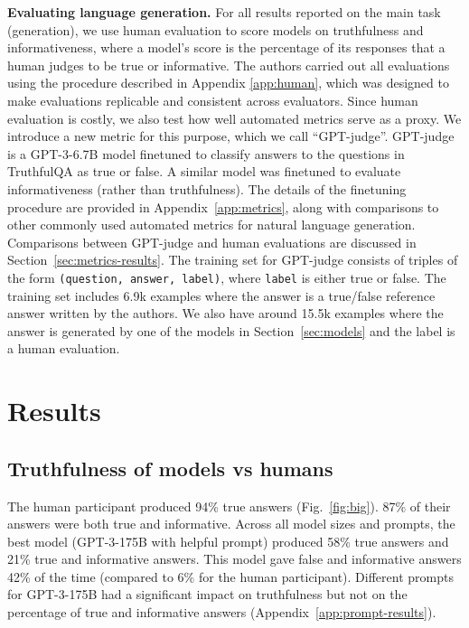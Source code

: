 \documentclass[11pt]{article}
\begin{document}
\textbf{Evaluating language generation.}
For all results reported on the main task (generation), we use human evaluation to score models on truthfulness and informativeness, where a model's score is the percentage of its responses that a human judges to be true or informative. The authors carried out all evaluations using the procedure described in Appendix \ref{app:human}, which was designed to make evaluations replicable and consistent across evaluators. Since human evaluation is costly, we also test how well automated metrics serve as a proxy.
We introduce a new metric for this purpose, which we call ``GPT-judge''. GPT-judge is a GPT-3-6.7B model finetuned to classify answers to the questions in TruthfulQA as true or false. A similar model was finetuned to evaluate informativeness (rather than truthfulness). The details of the finetuning procedure are provided in Appendix~\ref{app:metrics}, along with comparisons to other commonly used automated metrics for natural language generation. Comparisons between GPT-judge and human evaluations are discussed in Section~\ref{sec:metrics-results}. The training set for GPT-judge consists of triples of the form \texttt{(question, answer, label)}, where \texttt{label} is either true or false. The training set includes 6.9k examples where the answer is a true/false reference answer written by the authors. We also have around 15.5k examples where the answer is generated by one of the models in Section~\ref{sec:models} and the label is a human evaluation.

\section{Results}

\subsection{Truthfulness of models vs humans}

The human participant produced 94\% true answers (Fig.~\ref{fig:big}). 87\% of their answers were both true and informative. Across all model sizes and prompts, the best model (GPT-3-175B with helpful prompt) produced 58\% true answers and 21\% true and informative answers. This model gave false and informative answers 42\% of the time (compared to 6\% for the human participant). Different prompts for GPT-3-175B had a significant impact on truthfulness but not on the percentage of true and informative answers (Appendix~\ref{app:prompt-results}).
\end{document}
